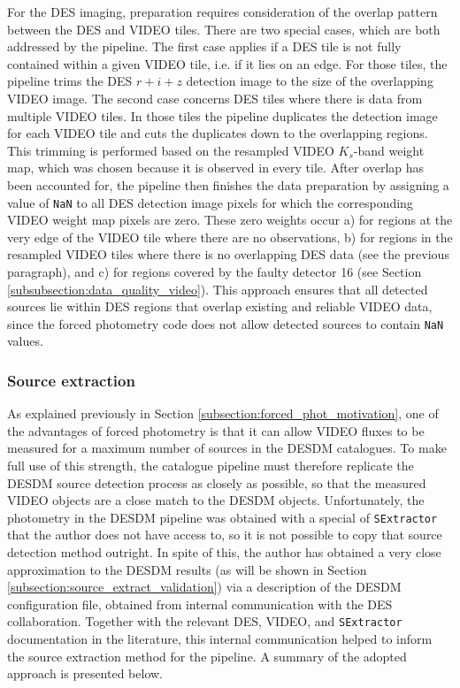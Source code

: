 For the DES imaging, preparation requires consideration of the overlap pattern between the DES and VIDEO tiles. There are two special cases, which are both addressed by the pipeline. The first case applies if a DES tile is not fully contained within a given VIDEO tile, i.e. if it lies on an edge. For those tiles, the pipeline trims the DES $r+i+z$ detection image to the size of the overlapping VIDEO image. The second case concerns DES tiles where there is data from multiple VIDEO tiles. In those tiles the pipeline duplicates the detection image for each VIDEO tile and cuts  the duplicates down to the overlapping regions. This trimming is performed based on the resampled VIDEO $K_{s}$-band weight map, which was chosen because it is observed in every tile. After overlap has been accounted for, the pipeline then finishes the data preparation by assigning a value of \texttt{NaN} to all DES detection image pixels for which the corresponding VIDEO weight map pixels are zero. These zero weights occur a) for regions at the very edge of the VIDEO tile where there are no observations, b) for regions in the resampled VIDEO tiles where there is no overlapping DES data (see the previous paragraph), and c) for regions covered by the faulty detector 16 (see Section \ref{subsubsection:data_quality_video}). This approach ensures that all detected sources lie within DES regions that overlap existing and reliable VIDEO data, since the forced photometry code does not allow detected sources to contain \texttt{NaN} values. \par 


\subsubsection{Source extraction}\label{subsubsection:forced_phot_extraction}
As explained previously in Section \ref{subsection:forced_phot_motivation}, one of the advantages of forced photometry is that it can allow VIDEO fluxes to be measured for a maximum number of sources in the DESDM catalogues. To make full use of this strength, the \DESVIDEO catalogue pipeline must therefore replicate the DESDM source detection process as closely as possible, so that the measured VIDEO objects are a close match to the DESDM objects. Unfortunately, the photometry in the DESDM pipeline was obtained with a special of \texttt{SExtractor} that the author does not have access to, so it is not possible to copy that source detection method outright. In spite of this, the author has obtained a very close approximation to the DESDM results (as will be shown in Section \ref{subsection:source_extract_validation}) via a description of the DESDM configuration file, obtained from internal communication with the DES collaboration. Together with the relevant DES, VIDEO, and \texttt{SExtractor} documentation in the literature, this internal communication helped to inform the source extraction method for the \DESVIDEO pipeline. A summary of the adopted approach is presented below. \par 

